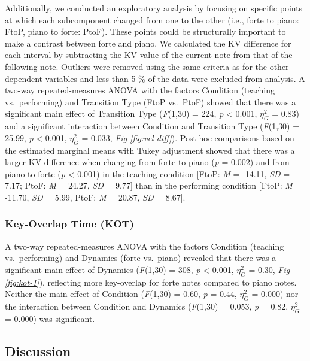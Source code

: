 \documentclass[
  man,floatsintext]{apa6}
\begin{document}
Additionally, we conducted an exploratory analysis by focusing on specific points at which each subcomponent changed from one to the other (i.e., forte to piano: FtoP, piano to forte: PtoF). These points could be structurally important to make a contrast between forte and piano. We calculated the KV difference for each interval by subtracting the KV value of the current note from that of the following note. Outliers were removed using the same criteria as for the other dependent variables and less than 5 \% of the data were excluded from analysis. A two-way repeated-measures ANOVA with the factors Condition (teaching vs.~performing) and Transition Type (FtoP vs.~PtoF) showed that there was a significant main effect of Transition Type (\emph{F}(1,30) = 224, \emph{p} \textless{} 0.001, \(\eta_G^2\) = 0.83) and a significant interaction between Condition and Transition Type (\emph{F}(1,30) = 25.99, \emph{p} \textless{} 0.001, \(\eta_G^2\) = 0.033, \emph{Fig \ref{fig:vel-diff}}). Post-hoc comparisons based on the estimated marginal means with Tukey adjustment showed that there was a larger KV difference when changing from forte to piano (\emph{p} = 0.002) and from piano to forte (\emph{p} \textless{} 0.001) in the teaching condition {[}FtoP: \emph{M} = -14.11, \emph{SD} = 7.17; PtoF: \emph{M} = 24.27, \emph{SD} = 9.77{]} than in the performing condition {[}FtoP: \emph{M} = -11.70, \emph{SD} = 5.99, PtoF: \emph{M} = 20.87, \emph{SD} = 8.67{]}.

\hypertarget{key-overlap-time-kot-1}{%
\subsubsection{Key-Overlap Time (KOT)}\label{key-overlap-time-kot-1}}

A two-way repeated-measures ANOVA with the factors Condition (teaching vs.~performing) and Dynamics (forte vs.~piano) revealed that there was a significant main effect of Dynamics (\emph{F}(1,30) = 308, \emph{p} \textless{} 0.001, \(\eta_G^2\) = 0.30, \emph{Fig \ref{fig:kot-1}}), reflecting more key-overlap for forte notes compared to piano notes. Neither the main effect of Condition (\emph{F}(1,30) = 0.60, \emph{p} = 0.44, \(\eta_G^2\) = 0.000) nor the interaction between Condition and Dynamics (\emph{F}(1,30) = 0.053, \emph{p} = 0.82, \(\eta_G^2\) = 0.000) was significant.

\hypertarget{discussion}{%
\subsection{Discussion}\label{discussion}}
\end{document}
